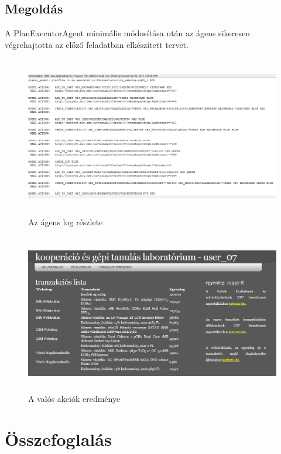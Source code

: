 \subsection{Megoldás}
A PlanExecutorAgent minimális módosítása után az ágens sikeresen végrehajtotta az előző feladatban elkészített tervet.
\begin{figure}[h]
\begin{center}
\includegraphics[height=7cm]{figures/dump2.png}
\caption{Az ágens log részlete}
\end{center}
\end{figure}
\begin{figure}[h]
\begin{center}
\includegraphics[height=7cm]{figures/web2.png}
\caption{A valós akciók eredménye}
\end{center}
\end{figure}
\section{Összefoglalás}
